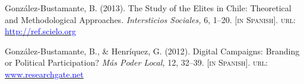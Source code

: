 \begin{publications}
\begin{benumerate}{12}
\item{\small Gonz\'alez-Bustamante, B. (2013). The Study of the Elites in Chile: Theoretical and Methodological Approaches. {\itshape Intersticios Sociales,} 6, 1--20. {\footnotesize \scshape [in Spanish]}. {\scshape url}: \href{http://ref.scielo.org/zrnp2k}{\textcolor{blue}{http://ref.scielo.org}}} \vspace{1mm}

\item{\small Gonz\'alez-Bustamante, B., \& Henr\'iquez, G. (2012). Digital Campaigns: Branding or Political Participation? {\itshape M\'as Poder Local,} 12, 32--39. {\footnotesize \scshape [in Spanish]}. {\scshape url}: \href{https://www.researchgate.net/publication/260517478_Campanas_digitales_Branding_o_participacion_politica_El_rol_de_las_redes_sociales_en_la_ultima_campana_presidencial_chilena}{\textcolor{blue}{www.researchgate.net}}} \vspace{1mm}

\end{benumerate}

\end{publications}
